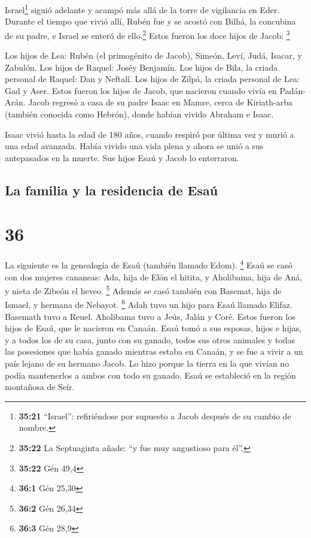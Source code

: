  Israel\footnote{\textbf{35:21} ``Israel'': refiriéndose
  por supuesto a Jacob después de su cambio de nombre.} siguió adelante
y acampó más allá de la torre de vigilancia en Eder. 
Durante el tiempo que vivió allí, Rubén fue y se acostó con Bilhá, la
concubina de su padre, e Israel se enteró de ello.\footnote{\textbf{35:22}
  La Septuaginta añade: ``y fue muy angustioso para él''.} Estos fueron
los doce hijos de Jacob: \footnote{\textbf{35:22} Gén 49,4}

 Los hijos de Lea: Rubén (el primogénito de Jacob),
Simeón, Leví, Judá, Isacar, y Zabulón.  Los hijos de
Raquel: Joséy Benjamín.  Los hijos de Bila, la criada
personal de Raquel: Dan y Neftalí.  Los hijos de Zilpá,
la criada personal de Lea: Gad y Aser. Estos fueron los hijos de Jacob,
que nacieron cuando vivía en Padán-Arán.  Jacob regresó a
casa de su padre Isaac en Mamre, cerca de Kiriath-arba (también conocida
como Hebrón), donde habían vivido Abraham e Isaac.

 Isaac vivió hasta la edad de 180 años, 
cuando respiró por última vez y murió a una edad avanzada. Había vivido
una vida plena y ahora se unió a sus antepasados en la muerte. Sus hijos
Esaú y Jacob lo enterraron.

\hypertarget{la-familia-y-la-residencia-de-esauxfa}{%
\subsection{La familia y la residencia de
Esaú}\label{la-familia-y-la-residencia-de-esauxfa}}

\hypertarget{section-35}{%
\section{36}\label{section-35}}

 La siguiente es la genealogía de Esaú (también llamado
Edom). \footnote{\textbf{36:1} Gén 25,30}  Esaú se casó
con dos mujeres cananeas: Ada, hija de Elón el hitita, y Aholibama, hija
de Aná, y nieta de Zibeón el heveo. \footnote{\textbf{36:2} Gén 26,34}
 Además se casó también con Basemat, hija de Ismael, y
hermana de Nebayot. \footnote{\textbf{36:3} Gén 28,9} 
Adah tuvo un hijo para Esaú llamado Elifaz. Basemath tuvo a Reuel.
 Aholibama tuvo a Jeús, Jalán y Coré. Estos fueron los
hijos de Esaú, que le nacieron en Canaán.  Esaú tomó a sus
esposas, hijos e hijas, y a todos los de su casa, junto con su ganado,
todos sus otros animales y todas las posesiones que había ganado
mientras estaba en Canaán, y se fue a vivir a un país lejano de su
hermano Jacob.  Lo hizo porque la tierra en la que vivían
no podía mantenerlos a ambos con todo su ganado.  Esaú se
estableció en la región montañosa de Seír.

